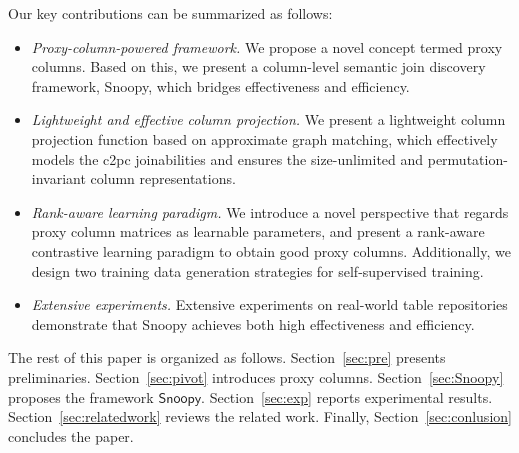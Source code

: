 Our key contributions can be summarized as follows:
\begin{itemize}  
\vspace{-1mm}
\item{} \textit{Proxy-column-powered framework.} We propose a novel concept termed proxy columns. Based on this, we present a column-level semantic join discovery framework, \textsf{Snoopy}, which bridges effectiveness and efficiency.

\item{} \textit{Lightweight and effective column projection.}
We present a lightweight column projection function based on approximate graph matching, which effectively models the c2pc joinabilities and ensures the size-unlimited and permutation-invariant column representations.


\item \textit{Rank-aware learning paradigm.} We introduce a novel perspective that regards proxy column matrices as learnable parameters, and present a rank-aware contrastive learning paradigm to obtain good proxy columns.
Additionally, we design two training data generation strategies for self-supervised training.

\item{} \textit{Extensive experiments.} Extensive experiments on real-world table repositories demonstrate
that \textsf{Snoopy} achieves both high effectiveness and efficiency.

\end{itemize}

The rest of this paper is organized as follows.
Section~\ref{sec:pre} presents preliminaries. Section~\ref{sec:pivot} introduces proxy columns.  Section~\ref{sec:Snoopy} proposes the framework $\textsf{Snoopy}$. Section~\ref{sec:exp} reports experimental results. 
Section~\ref{sec:relatedwork} reviews the related work. Finally, Section~\ref{sec:conlusion} concludes the paper.

